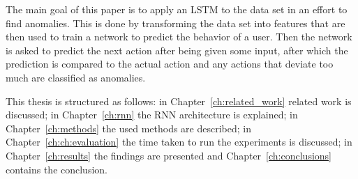 The main goal of this paper is to apply an LSTM to the data set in an effort to find anomalies. This is done by transforming the data set into features that are then used to train a network to predict the behavior of a user. Then the network is asked to predict the next action after being given some input, after which the prediction is compared to the actual action and any actions that deviate too much are classified as anomalies.

This thesis is structured as follows: in Chapter~\ref{ch:related_work} related work is discussed; in Chapter~\ref{ch:rnn} the RNN architecture is explained; in Chapter~\ref{ch:methods} the used methods are described; in Chapter~\ref{ch:ch:evaluation} the time taken to run the experiments is discussed; in Chapter~\ref{ch:results} the findings are presented and Chapter~\ref{ch:conclusions} contains the conclusion.